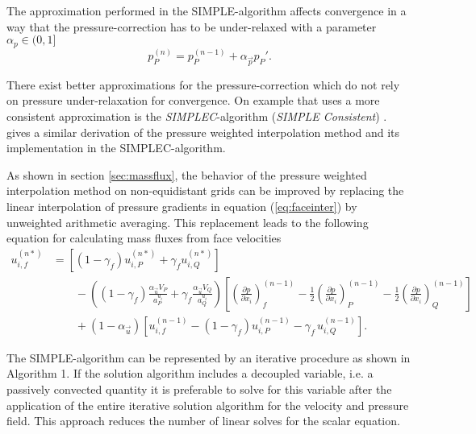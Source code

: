 The approximation performed in the SIMPLE-algorithm affects convergence in a way that the pressure-correction has to be under-relaxed with a parameter \(\alpha_p \in (0,1]\)
\begin{equation}
  \label{eq:pressupdate}
  p_P^{(n)} = p_P^{(n-1)} + \alpha_{\vec{p}} p_P'.
\end{equation}

There exist better approximations for the pressure-correction which do not rely on pressure under-relaxation for convergence. On example that uses a more consistent approximation is the \emph{SIMPLEC}-algorithm (\emph{SIMPLE Consistent}) \cite{doormaal84}. \cite{miller88} gives a similar derivation of the pressure weighted interpolation method and its implementation in the SIMPLEC-algorithm.

As shown in section \ref{sec:massflux}, the behavior of the pressure weighted interpolation method on non-equidistant grids can be improved by replacing the linear interpolation of pressure gradients in equation (\ref{eq:faceinter}) by unweighted arithmetic averaging. This replacement leads to the following equation for calculating mass fluxes from face velocities
\begin{align}
  \label{eq:facecorr2}
  u_{i,f}^{(n*)} 
  &=
  \left[\left(1 - \gamma_f\right) u_{i,P}^{(n*)} + \gamma_f u_{i,Q}^{(n*)} \right] \nonumber\\[1em]
  &\quad\quad - 
  \left(\left(1 - \gamma_f\right) \frac{\alpha_\vec{u} V_P}{a_P^{u_i}} + \gamma_f \frac{\alpha_\vec{u} V_Q}{a_Q^{u_i}}\right)
  \left[ 
  \left(\frac{\partial p}{\partial x_i}\right)_f^{(n-1)} 
  -  \frac{1}{2} \left( \frac{\partial p}{\partial x_i} \right)_P^{(n-1)} 
  -  \frac{1}{2} \left(\frac{\partial p}{\partial x_i}\right)_Q^{(n-1)} 
  \right] \nonumber \\[1em]
  &\quad\quad + \left(1 - \alpha_\vec{u}\right) \left[ u_{i,f}^{(n-1)} - \left(1 - \gamma_f\right) u_{i,P}^{(n-1)} - \gamma_f \, u_{i,Q}^{(n-1)} \right].
\end{align}

The SIMPLE-algorithm can be represented by an iterative procedure as shown in Algorithm 1. If the solution algorithm includes a decoupled variable, i.e. a passively convected quantity it is preferable to solve for this variable after the application of the entire iterative solution algorithm for the velocity and pressure field. This approach reduces the number of linear solves for the scalar equation.

